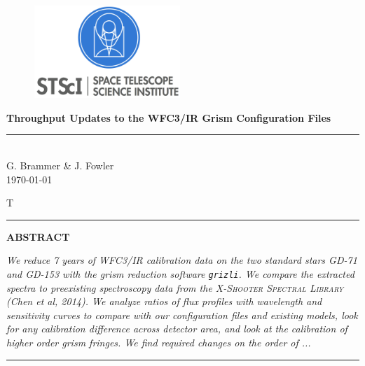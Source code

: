 \documentclass[12pt]{article}
\begin{document}
\begin{figure}[h]
\begin{minipage}[t]{40cm}
\includegraphics[height=35mm]{images/stlogo.png}
\end{minipage}
\end{figure}


\begin{flushright}
{\huge\bf \hfill Throughput Updates to the WFC3/IR Grism Configuration Files }
\rule{145mm}{0.3mm}
\smallskip \\
    \hfill {G. Brammer \& J. Fowler}\\
 \today
 \end{flushright}
 \medskip

T

\hrule height 1.5pt
\smallskip
\noindent \large{\bf A}\footnotesize{\bf BSTRACT}

\noindent
\textit{We reduce 7 years of WFC3/IR calibration data on the two 
standard stars GD-71 and GD-153 with the grism reduction software \texttt{grizli}. 
We compare the extracted spectra to preexisting spectroscopy data from the 
\textsc{X-Shooter Spectral Library} (Chen et al, 2014). We analyze ratios of flux profiles 
with wavelength and sensitivity curves to compare with our configuration files
and existing models, look for any calibration difference across detector area,
and look at the calibration of higher order grism fringes.  
We find required changes on the order of ... }

\smallskip
\medskip
\hrule height 1.5pt

\end{document}
